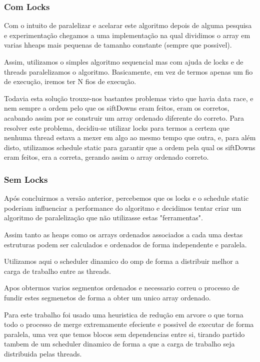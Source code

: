 \documentclass{article}
\begin{document}
\subsubsection{Com Locks}
Com o intuito de paralelizar e acelarar este algoritmo depois de alguma pesquisa e experimentação chegamos a uma implementação na qual dividimos o array em varias hheaps mais pequenas de tamanho constante (sempre que possivel). 
\par Assim, utilizamos o simples algoritmo sequencial mas com ajuda de locks e de threads paralelizamos o algoritmo. Basicamente, em vez de termos apenas um fio de execução, iremos ter N fios de execução.
\par Todavia esta solução trouxe-nos bastantes problemas visto que havia data race, e nem sempre a ordem pelo que os siftDowns eram feitos, eram os corretos, acabando assim por se construir um array ordenado diferente do correto.
\para Para resolver este problema, decidiu-se utilizar locks para termos a certeza que nenhuma thread estava a mexer em algo ao mesmo tempo que outra, e, para além disto, utilizamos schedule static para garantir que a ordem pela qual os siftDowns eram feitos, era a correta, gerando assim o array ordenado correto.

\subsubsection{Sem Locks}
\par Após concluirmos a versão anterior, percebemos que os locks e o schedule static poderiam influenciar a performance do algoritmo e decidimos tentar criar um algoritmo de paralelização que não utilizasse estas "ferramentas".
\par Assim tanto as heaps como os arrays ordenados associados a cada uma destas estruturas podem ser calculados e ordenados de forma independente e paralela. 
\par Utilizamos aqui o scheduler dinamico do omp de forma a distribuir melhor a carga de trabalho entre as threads. 
\par Apos obtermos varios segmentos ordenados e necessario correu o processo de fundir estes segmenetos de forma a obter um unico array ordenado. 
\par Para este trabalho foi usado uma heuristica de redução em arvore o que torna todo o processo de merge extremamente efeciente e possivel de executar de forma paralela, uma vez que temos blocos sem dependencias entre si, tirando partido tambem de um scheduler dinamico de forma a que a carga de trabalho seja distribuida pelas threads.
\end{document}

